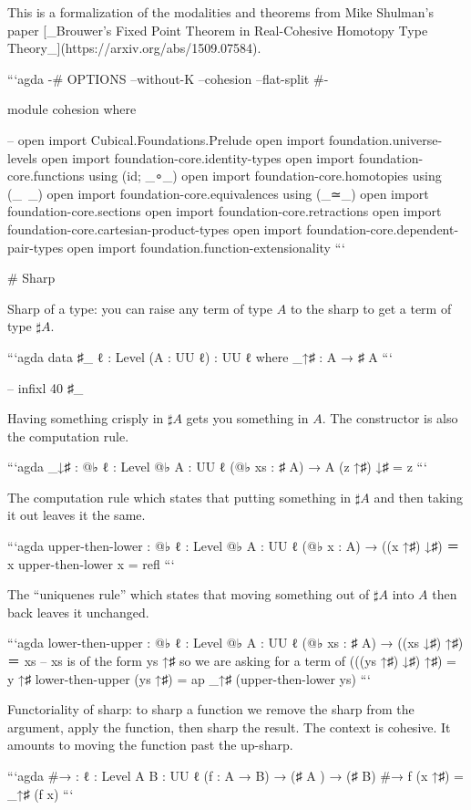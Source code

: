 This is a formalization of the modalities and theorems from Mike Shulman's paper [_Brouwer's Fixed Point Theorem in Real-Cohesive Homotopy Type Theory_](https://arxiv.org/abs/1509.07584). 

```agda
{-# OPTIONS --without-K --cohesion --flat-split #-}

module cohesion where

-- open import Cubical.Foundations.Prelude
open import foundation.universe-levels
open import foundation-core.identity-types
open import foundation-core.functions using (id; _∘_)
open import foundation-core.homotopies using (_~_)
open import foundation-core.equivalences using (_≃_)
open import foundation-core.sections
open import foundation-core.retractions
open import foundation-core.cartesian-product-types
open import foundation-core.dependent-pair-types
open import foundation.function-extensionality
```

# Sharp

Sharp of a type: you can raise any term of type $A$ to the sharp to get a term of type $\sharp A$.

```agda
data ♯_ {ℓ : Level} (A : UU ℓ) : UU ℓ where
  _↑♯ : A → ♯ A
```

-- infixl 40 ♯_

Having something crisply in $\sharp A$ gets you something in $A$. The constructor is also the computation rule.

```agda
_↓♯ : {@♭ ℓ : Level} {@♭ A : UU ℓ} (@♭ xs : ♯ A) → A
(z ↑♯) ↓♯ = z
```

The computation rule which states that putting something in $\sharp A$ and then taking it out leaves it the same.

```agda
upper-then-lower : {@♭ ℓ : Level} {@♭ A : UU ℓ} (@♭ x : A) → ((x ↑♯) ↓♯) ＝ x
upper-then-lower x = refl
```

The ``uniquenes rule'' which states that moving something out of $\sharp A$ into $A$ then back leaves it unchanged.

```agda
lower-then-upper : {@♭ ℓ : Level} {@♭ A : UU ℓ} (@♭ xs : ♯ A) → ((xs ↓♯) ↑♯) ＝ xs
-- xs is of the form ys ↑♯ so we are asking for a term of (((ys ↑♯) ↓♯) ↑♯) = y ↑♯
lower-then-upper (ys ↑♯) = ap _↑♯ (upper-then-lower ys)
```

Functoriality of sharp: to sharp a function we remove the sharp from the argument, apply the function, then sharp the result. The context is cohesive. It amounts to moving the function past the up-sharp.

```agda
#→ : {ℓ : Level} {A B : UU ℓ} (f : A → B) → (♯ A ) → (♯ B)
#→ f (x ↑♯) = _↑♯ (f x)
```

